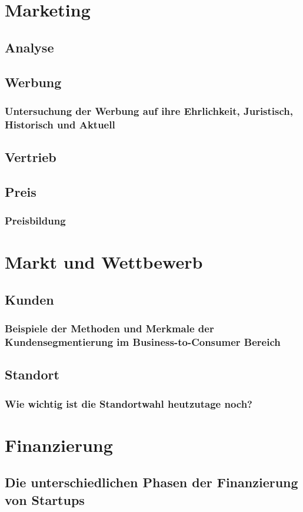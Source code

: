 \chapter{Marketing}
\section{Analyse}
\section{Werbung}
\subsection{Untersuchung der Werbung auf ihre Ehrlichkeit, Juristisch, Historisch und Aktuell}

\section{Vertrieb}
\section{Preis}
\subsection{Preisbildung}

\chapter{Markt und Wettbewerb}
\section{Kunden}
\subsection{Beispiele der Methoden und Merkmale der Kundensegmentierung im Business-to-Consumer Bereich}

\section{Standort}
\subsection{Wie wichtig ist die Standortwahl heutzutage noch?}

\chapter{Finanzierung}
\section{Die unterschiedlichen Phasen der Finanzierung von Startups}

